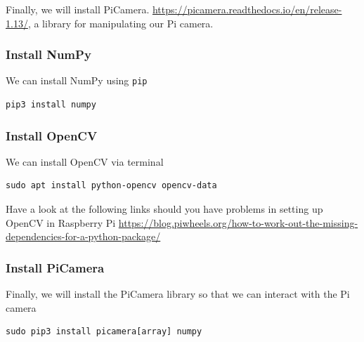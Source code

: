 Finally, we will install PiCamera. \url{https://picamera.readthedocs.io/en/release-1.13/}, a library for manipulating our Pi camera.


\subsubsection{Install NumPy}

We can install NumPy using \lstinline{pip}

\begin{lstlisting}
pip3 install numpy
\end{lstlisting}

\subsubsection{Install OpenCV}

We can install OpenCV via terminal

\begin{lstlisting}
sudo apt install python-opencv opencv-data
\end{lstlisting}

\begin{framed}
\begin{remark}

Have a look at the following links should you have problems in setting up OpenCV in Raspberry Pi
\url{https://blog.piwheels.org/how-to-work-out-the-missing-dependencies-for-a-python-package/}
\end{remark}
\end{framed}

\subsubsection{Install PiCamera}
\label{install_picamera}

Finally, we will install the PiCamera library so that we can interact with the Pi camera

\begin{lstlisting}
sudo pip3 install picamera[array] numpy
\end{lstlisting}

